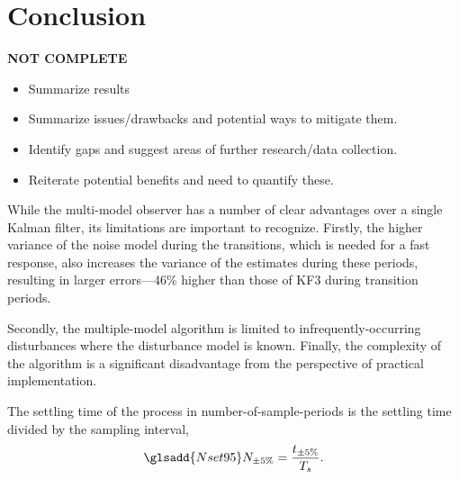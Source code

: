 \chapter*{Conclusion}           %
\label{chap-conclusion}         %

\textbf{NOT COMPLETE}

\begin{itemize}
	\item Summarize results
	\item Summarize issues/drawbacks and potential ways to mitigate them.
	\item Identify gaps and suggest areas of further research/data collection.
	\item Reiterate potential benefits and need to quantify these.
\end{itemize}

While the multi-model observer has a number of clear advantages over a single Kalman filter, its limitations are important to recognize. Firstly, the higher variance of the noise model during the transitions, which is needed for a fast response, also increases the variance of the estimates during these periods, resulting in larger errors---46\% higher than those of KF3 during transition periods.

Secondly, the multiple-model algorithm is limited to infrequently-occurring disturbances where the disturbance model is known. Finally, the complexity of the algorithm is a significant disadvantage from the perspective of practical implementation.


The settling time of the process in number-of-sample-periods is the settling time divided by the sampling interval,
\begin{equation} \label{eq:Nsettle}
	\glsadd{Nset95}N_{\pm 5\%}=\frac{t_{\pm 5\%}}{T_s}.
\end{equation}

